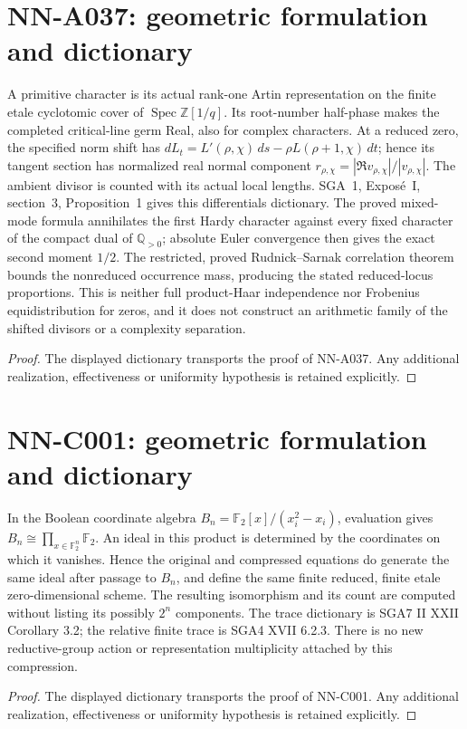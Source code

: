 \section{NN-A037: geometric formulation and dictionary}
\begin{geometricstatement}[NN-A037]
A primitive character is its actual rank-one Artin representation on the finite etale cyclotomic cover of $\operatorname{Spec}\mathbb Z[1/q]$. Its root-number half-phase makes the completed critical-line germ Real, also for complex characters. At a reduced zero, the specified norm shift has $dL_t=L\prime(\rho,\chi)\,ds-\rho L(\rho+1,\chi)\,dt$; hence its tangent section has normalized real normal component $r_{\rho,\chi}=|\Re v_{\rho,\chi}|/|v_{\rho,\chi}|$. The ambient divisor is counted with its actual local lengths. SGA~1, Expos\'e~I, section~3, Proposition~1 gives this differentials dictionary. The proved mixed-mode formula annihilates the first Hardy character against every fixed character of the compact dual of $\mathbb Q_{>0}$; absolute Euler convergence then gives the exact second moment $1/2$. The restricted, proved Rudnick--Sarnak correlation theorem bounds the nonreduced occurrence mass, producing the stated reduced-locus proportions. This is neither full product-Haar independence nor Frobenius equidistribution for zeros, and it does not construct an arithmetic family of the shifted divisors or a complexity separation.
\end{geometricstatement}
\begin{proof} The displayed dictionary transports the proof of NN-A037. Any additional realization, effectiveness or uniformity hypothesis is retained explicitly.\end{proof}


\section{NN-C001: geometric formulation and dictionary}
\begin{geometricstatement}[NN-C001]
In the Boolean coordinate algebra $B_n=\mathbb F_2[x]/(x_i^2-x_i)$, evaluation gives $B_n\cong\prod_{x\in\mathbb F_2^n}\mathbb F_2$. An ideal in this product is determined by the coordinates on which it vanishes. Hence the original and compressed equations do generate the same ideal after passage to $B_n$, and define the same finite reduced, finite etale zero-dimensional scheme. The resulting isomorphism and its count are computed without listing its possibly $2^n$ components. The trace dictionary is SGA7 II XXII Corollary 3.2; the relative finite trace is SGA4 XVII 6.2.3. There is no new reductive-group action or representation multiplicity attached by this compression.
\end{geometricstatement}
\begin{proof} The displayed dictionary transports the proof of NN-C001. Any additional realization, effectiveness or uniformity hypothesis is retained explicitly.\end{proof}



